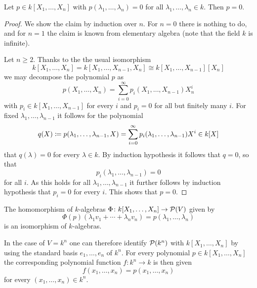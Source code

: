 \begin{lemma}
  \label{lemma: polynomial vanishes everywhere}
  Let $p \in k[X_1, \dotsc, X_n]$ with $p(\lambda_1, \dotsc, \lambda_n) = 0$ for all $\lambda_1, \dotsc, \lambda_n \in k$.
  Then $p = 0$.
\end{lemma}


\begin{proof}
  We show the claim by induction over $n$.
  For $n = 0$ there is nothing to do, and for $n = 1$ the claim is known from elementary algebra (note that the field $k$ is infinite).
  
  Let $n \geq 2$.
  Thanks to the the usual isomorphism
  \[
          k[X_1, \dotsc, X_n]
    =     k[X_1, \dotsc, X_{n-1}, X_n]
    \cong k[X_1, \dotsc, X_{n-1}][X_n]
  \]
  we may decompose the polynomial $p$ as
  \[
      p(X_1, \dotsc, X_n)
    = \sum_{i=0}^\infty p_i(X_1, \dotsc, X_{n-1}) X_n^i
  \]
  with $p_i \in k[X_1, \dotsc, X_{n-1}]$ for every $i$ and $p_i = 0$ for all but finitely many $i$.
  For fixed $\lambda_1, \dotsc, \lambda_{n-1}$ it follows for the polynomial
  \[
              q(X)
    \coloneqq  p(\lambda_1, \dotsc, \lambda_{n-1}, X)
    =         \sum_{i=0}^\infty p_i(\lambda_1, \dotsc, \lambda_{n-1}) X^i
    \in       k[X]
  \]
  that $q(\lambda) = 0$ for every $\lambda \in k$.
  By induction hypothesis it follows that $q = 0$, so that
  \[
      p_i(\lambda_1, \dotsc, \lambda_{n-1})
    = 0
  \]
  for all $i$.
  As this holds for all $\lambda_1, \dotsc, \lambda_{n-1}$ it further follows by induction hypothesis that $p_i = 0$ for every $i$.
  This shows that $p = 0$.
\end{proof}


\begin{corollary}
  \label{corollary: isomorphism poylnomial ring and polynomial maps}
  The homomorphism of $k$-algebras $\Phi \colon k[X_1, \dotsc, X_n] \to \mathcal{P}(V)$ given by
  \[
      \Phi(p)(\lambda_1 v_1 + \dotsb + \lambda_n v_n)
    = p(\lambda_1, \dotsc, \lambda_n)
  \]
  is an isomorphism of $k$-algebras.
\end{corollary}


\begin{fluff}
  \label{fluff: identify polynomials with polynomial maps for kn}
  In the case of $V = k^n$ one can therefore identify $\mathcal{P}(k^n)$ with $k[X_1, \dotsc, X_n]$ by using the standard basis $e_1, \dotsc, e_n$ of $k^n$.
  For every polynomial $p \in k[X_1, \dotsc, X_n]$ the corresponding polynomial function $f \colon k^n \to k$ is then given
  \[
      f(x_1, \dotsc, x_n)
    = p(x_1, \dotsc, x_n)
  \]
  for every $(x_1, \dotsc, x_n) \in k^n$.
\end{fluff}


